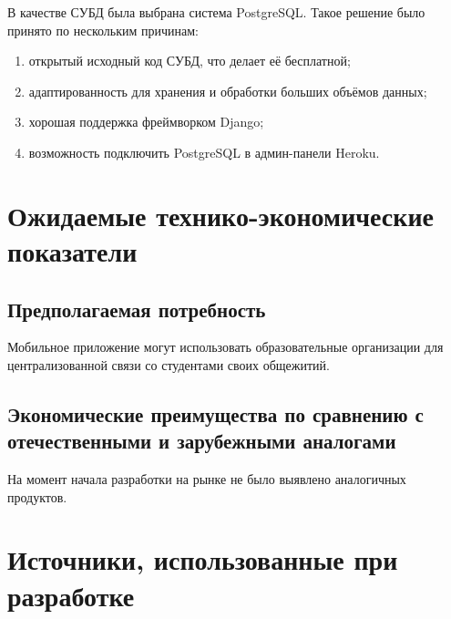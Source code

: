 \documentclass{../includes/TechDoc}
\begin{document}
    В качестве СУБД была выбрана система PostgreSQL\@.
    Такое решение было принято по нескольким причинам:
    \begin{enumerate}
        \item открытый исходный код СУБД, что делает её бесплатной;
        \item адаптированность для хранения и обработки больших объёмов данных;
        \item хорошая поддержка фреймворком Django;
        \item возможность подключить PostgreSQL в админ-панели Heroku.
    \end{enumerate}


    \section{Ожидаемые технико-экономические показатели}

    \subsection{Предполагаемая потребность}

    Мобильное приложение могут использовать образовательные организации для централизованной связи со студентами своих
    общежитий.

    \subsection{Экономические преимущества по сравнению с отечественными и зарубежными аналогами}

    На момент начала разработки на рынке не было выявлено аналогичных продуктов.

    \clearpage


    \section{Источники, использованные при разработке}
\end{document}
